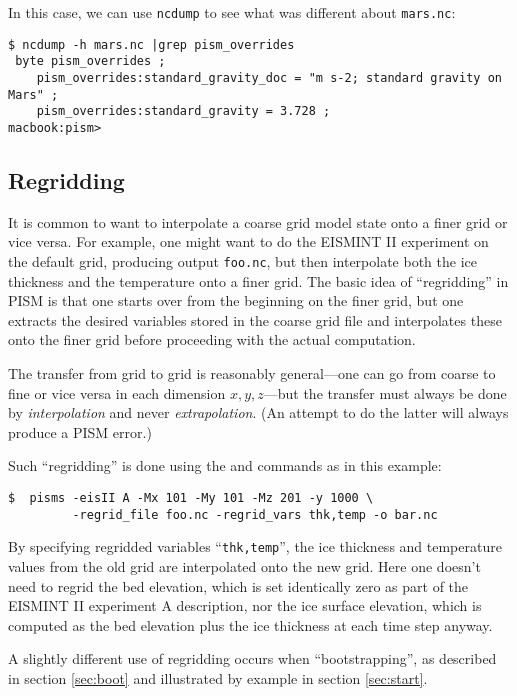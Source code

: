 In this case, we can use \texttt{ncdump} to see what was different about \texttt{mars.nc}:
\small
\begin{verbatim}
$ ncdump -h mars.nc |grep pism_overrides
 byte pism_overrides ;
    pism_overrides:standard_gravity_doc = "m s-2; standard gravity on Mars" ;
    pism_overrides:standard_gravity = 3.728 ;
macbook:pism>
\end{verbatim}
\normalsize

\subsection{Regridding}
\label{sec:regridding}

It is common to want to interpolate a coarse grid model state onto a finer grid or vice versa.  For example, one might want to do the EISMINT II experiment on the default grid, producing output \texttt{foo.nc}, but then interpolate both the ice thickness and the temperature onto a finer grid.  The basic idea of ``regridding'' in PISM is that one starts over from the beginning on the finer grid, but one extracts the desired variables stored in the coarse grid file and interpolates these onto the finer grid before proceeding with the actual computation.

The transfer from grid to grid is reasonably general---one can go from coarse to fine or vice versa in each dimension $x,y,z$---but the transfer must always be done by \emph{interpolation} and never \emph{extrapolation}.  (An attempt to do the latter will always produce a PISM error.)

Such ``regridding'' is done using the  and
 commands as in this example: 

\begin{verbatim}
$  pisms -eisII A -Mx 101 -My 101 -Mz 201 -y 1000 \
         -regrid_file foo.nc -regrid_vars thk,temp -o bar.nc
\end{verbatim}
\noindent By specifying regridded variables ``\texttt{thk,temp}'', the ice thickness and temperature values from the old grid are interpolated onto the new grid.  Here one doesn't need to regrid the bed elevation, which is set identically zero as part of the EISMINT II experiment A description, nor the ice surface elevation, which is computed as the bed elevation plus the ice thickness at each time step anyway.

A slightly different use of regridding occurs when ``bootstrapping'', as described in section \ref{sec:boot} and illustrated by example in section \ref{sec:start}.

